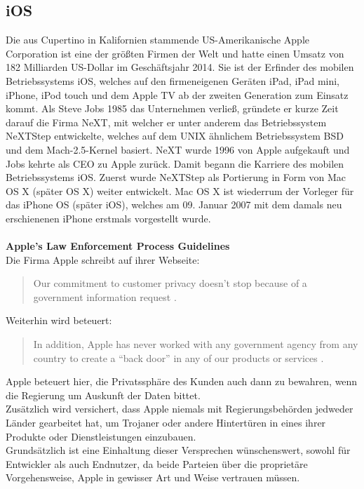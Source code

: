 \subsection{iOS}
	Die aus Cupertino in Kalifornien stammende US-Amerikanische Apple Corporation
	ist eine der größten Firmen der Welt und hatte einen Umsatz von 182 Milliarden
	US-Dollar im Geschäftsjahr 2014. Sie ist der Erfinder des mobilen
	Betriebssystems iOS, welches auf den firmeneigenen Geräten iPad, iPad mini,
	iPhone, iPod touch und dem Apple TV ab der zweiten Generation zum Einsatz
	kommt. Als Steve Jobs 1985 das Unternehmen verließ, gründete er
	kurze Zeit darauf die Firma NeXT, mit welcher er unter anderem das
	Betriebssystem NeXTStep entwickelte, welches auf dem UNIX ähnlichem
	Betriebssystem BSD \cite[S.12]{Tanenbaum2009} und dem
	Mach-2.5-Kernel \cite{MachProject2015} basiert. NeXT wurde 1996 von Apple
	aufgekauft und Jobs kehrte als CEO zu Apple zurück. Damit begann die Karriere
	des mobilen Betriebssystems iOS. Zuerst wurde NeXTStep als Portierung in Form
	von Mac OS X (später OS X) weiter entwickelt. Mac OS X ist wiederrum der
	Vorleger für das iPhone OS (später iOS), welches am 09. Januar 2007 mit dem
	damals neu erschienenen iPhone erstmals vorgestellt wurde.
	\\\\
	\textbf{Apple's Law Enforcement Process Guidelines}
	\\
	Die Firma Apple schreibt auf ihrer Webseite:
	\begin{quote}
		Our commitment to customer privacy doesn't stop because of a government
		information request \cite{AppleGovInfo2015}.
	\end{quote}
	Weiterhin wird beteuert:
	\begin{quote}
		In addition, Apple has never worked with any government agency from any
		country to create a "`back door"' in any of our products or
		services \cite{AppleGovInfo2015}.
	\end{quote}
	Apple beteuert hier, die Privatssphäre des Kunden auch dann zu bewahren,
	wenn die Regierung um Auskunft der Daten bittet.\\
	Zusätzlich wird versichert, dass Apple niemals mit Regierungsbehörden
	jedweder Länder gearbeitet hat, um Trojaner oder andere Hintertüren in eines
	ihrer Produkte oder Dienstleistungen einzubauen.\\
	Grundsätzlich ist eine Einhaltung dieser Versprechen wünschenswert, sowohl für
	Entwickler als auch Endnutzer, da beide Parteien über die proprietäre
	Vorgehensweise, Apple in gewisser Art und Weise vertrauen müssen.
